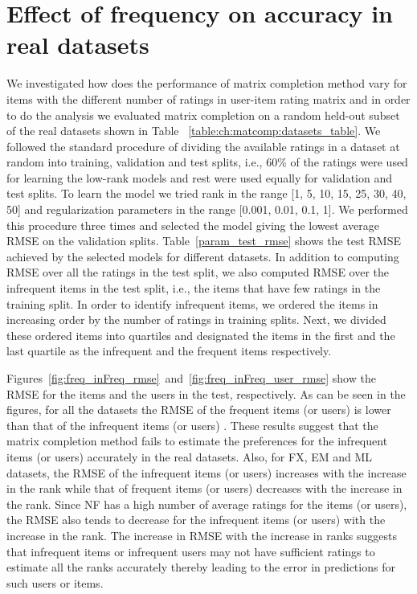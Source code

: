 \section{Effect of frequency  on accuracy in real datasets}
\label{ch:tmf:freqanal}

We investigated how does the performance of matrix completion method vary for items with the different number of ratings in user-item rating matrix and in order to do the analysis we evaluated matrix completion on a random held-out subset of the real datasets shown in Table ~\ref{table:ch:matcomp:datasets_table}. 
We followed the standard procedure of dividing
the available ratings in a dataset at random into training, validation and test
splits, i.e., 60\% of the ratings were used for learning the low-rank models and
rest were used equally for validation and test splits. 
To learn the model we tried rank in the range [1, 5, 10, 15, 25, 30, 40, 50] and regularization
parameters in the range [0.001, 0.01, 0.1, 1].
We performed this procedure three times and selected the model giving the lowest average RMSE on
the validation splits.
Table~\ref{param_test_rmse} shows the test RMSE achieved by the selected
models for different datasets.
In addition to computing RMSE over all the ratings in the test split, we also
computed RMSE over the infrequent items in the test split, i.e., the items that
have few ratings in the training split. 
In order to identify infrequent items, we ordered the items in increasing order by the number of
ratings in training splits. Next, we divided these ordered items into quartiles
and designated the items in the first and the last quartile as the infrequent
and the frequent items respectively.


Figures~\ref{fig:freq_inFreq_rmse}~and~\ref{fig:freq_inFreq_user_rmse} show 
the RMSE for the items and the users in the test, respectively.
As can be seen in the figures, for all the datasets the RMSE of the frequent
items (or users) is lower than that of the infrequent items (or users) .  
These results suggest that the matrix completion method fails to estimate the
preferences for the infrequent items (or users) accurately in the real datasets.
Also, for FX, EM and ML
datasets, the RMSE of the infrequent items (or users) increases with the increase in the
rank while that of frequent items (or users) decreases with the increase in the rank. Since
NF has a high number of average ratings for the items (or users), the RMSE also tends to decrease
for the infrequent items (or users) with the increase in the rank.
The increase in RMSE with the increase in ranks suggests that infrequent items or infrequent users may not 
have sufficient ratings to estimate all the ranks accurately thereby leading to the error in
predictions for such users or items. 

